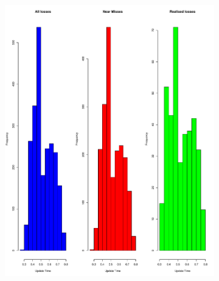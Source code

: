 \documentclass{DissertateUSU}
\begin{document}
\begin{figure}
\centering
\begin{subfigure}[b]{0.5\textwidth}
   \includegraphics[width=\linewidth]{Exploratory_UpdateTime_Frequency3plot.pdf}
   \label{Exploratory_UpdateTime_Frequency3plot} 
\end{subfigure}


\end{figure}
\end{document}
